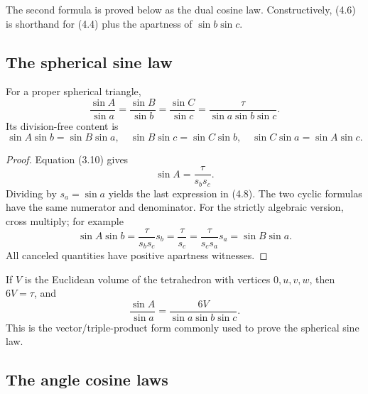 The second formula is proved below as the dual cosine law.  Constructively,
(4.6) is shorthand for (4.4) plus the apartness of \(\sin b\sin c\).

\subsection{The spherical sine law}

\begin{theorem}
\label{thm:sine-law}
For a proper spherical triangle,
\begin{equation}
 \frac{\sin A}{\sin a}
 =\frac{\sin B}{\sin b}
 =\frac{\sin C}{\sin c}
 =\frac{\tau}{\sin a\sin b\sin c}.                         \tag{4.8}
\end{equation}
Its division-free content is
\begin{equation}
 \sin A\sin b=\sin B\sin a,
 \quad
 \sin B\sin c=\sin C\sin b,
 \quad
 \sin C\sin a=\sin A\sin c.                              \tag{4.9}
\end{equation}
\end{theorem}

\begin{proof}
Equation (3.10) gives
\[
 \sin A=\frac{\tau}{s_bs_c}.
\]
Dividing by \(s_a=\sin a\) yields the last expression in (4.8).
The two cyclic formulas have the same numerator and denominator.  For the
strictly algebraic version, cross multiply; for example
\[
 \sin A\sin b=\frac{\tau}{s_bs_c}s_b=\frac\tau{s_c}
 =\frac{\tau}{s_cs_a}s_a=\sin B\sin a.
\]
All canceled quantities have positive apartness witnesses.
\end{proof}

\begin{corollary}
\label{cor:sine-volume}
If \(V\) is the Euclidean volume of the tetrahedron with vertices
\(0,u,v,w\), then \(6V=\tau\), and
\begin{equation}
 \frac{\sin A}{\sin a}
 =\frac{6V}{\sin a\sin b\sin c}.                           \tag{4.10}
\end{equation}
This is the vector/triple-product form commonly used to prove the spherical
sine law.
\end{corollary}

\subsection{The angle cosine laws}

